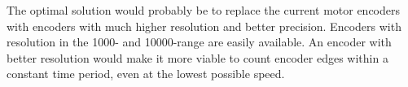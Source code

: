 \documentclass[../../main.tex]{subfiles}
\begin{document}




The optimal solution would probably be to replace the current motor encoders with encoders with much higher resolution and better precision. Encoders with resolution in the 1000- and 10000-range are easily available. An encoder with better resolution would make it more viable to count encoder edges within a constant time period, even at the lowest possible speed.

\end{document}
